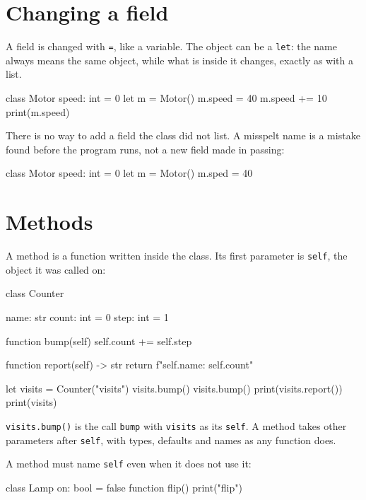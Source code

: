 \section{Changing a field}

A field is changed with \verb|=|, like a variable. The object can be a
\verb|let|: the name always means the same object, while what is
inside it changes, exactly as with a list.

\begin{zeno}
class Motor {
    speed: int = 0
}
let m = Motor()
m.speed = 40
m.speed += 10
print(m.speed)
\end{zeno}

There is no way to add a field the class did not list. A misspelt name
is a mistake found before the program runs, not a new field made in
passing:

\begin{zeno}[fails=yes]
class Motor {
    speed: int = 0
}
let m = Motor()
m.sped = 40
\end{zeno}

\section{Methods}

A method is a function written inside the class. Its first parameter
is \verb|self|, the object it was called on:

\begin{zeno}
class Counter {
    name: str
    count: int = 0
    step: int = 1

    function bump(self) {
        self.count += self.step
    }

    function report(self) -> str {
        return f"{self.name}: {self.count}"
    }
}

let visits = Counter("visits")
visits.bump()
visits.bump()
print(visits.report())
print(visits)
\end{zeno}

\verb|visits.bump()| is the call \verb|bump| with \verb|visits| as its
\verb|self|. A method takes other parameters after \verb|self|, with
types, defaults and names as any function does.

A method must name \verb|self| even when it does not use it:

\begin{zeno}[fails=yes]
class Lamp {
    on: bool = false
    function flip() {
        print("flip")
    }
}
\end{zeno}

